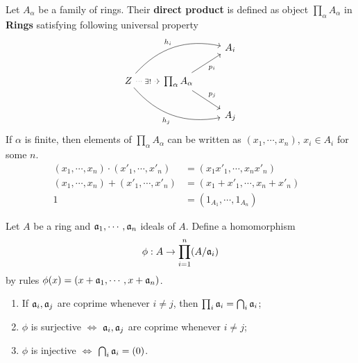 \documentclass{amsart}
\begin{document}
\begin{secdefn}
	Let $A_\alpha$ be a family of rings. Their \textbf{direct product} is defined as object $ \prod_{\alpha}A_{\alpha}$ in \textbf{Rings} satisfying following universal property
	\[
	\begin{tikzcd}
	&  & A_i \\
	Z \arrow[rru, "h_i", bend left] \arrow[r, "\exists! " description, dotted] \arrow[rrd, "h_j"', bend right] & \prod_{\alpha} A_{\alpha} \arrow[ru, "p_i"'] \arrow[rd, "p_j"] &  \\
	&  & A_j
	\end{tikzcd}
	\]
	If $\alpha$ is finite, then elements of $\prod_{\alpha}A_{\alpha}$ can be written as $(x_1, \cdots ,x_n)$, $x_i \in A_i$ for some $n$.
	\[
	\begin{aligned}
	(x_1, \cdots, x_n) \cdot (x'_1, \cdots, x'_n)&= (x_1 x'_1, \cdots, x_n x'_n)&\\
	(x_1, \cdots, x_n) +(x'_1, \cdots, x'_n)&= (x_1 + x'_1, \cdots, x_n + x'_n)&\\
	1&=(1_{A_1}, \cdots, 1_{A_n})&
	\end{aligned}
	\]
\end{secdefn}

Let $A$ be a ring and $\mathfrak{a}_1, \cdots, \mathfrak{a}_n$ ideals of $A$. Define a homomorphism
\[
\phi: A \rightarrow \prod_{i=1}^{n}(A/\mathfrak{a}_i)
\]
by rules $\phi(x)= (x+\mathfrak{a}_1, \cdots, x+\mathfrak{a}_n)$.

\begin{secprop}[\ref{}]
	\begin{enumerate}
		\item If $\mathfrak{a}_i, \mathfrak{a}_j$ are coprime whenever $i \neq j$, then $\prod_{i} \mathfrak{a}_i = \bigcap_{i} \mathfrak{a}_i$;
		\item $\phi$ is surjective $\Leftrightarrow$ $\mathfrak{a}_i,\mathfrak{a}_j$ are coprime whenever $i \neq j$;
		\item $\phi$ is injective $\Leftrightarrow$ $\bigcap_{i} \mathfrak{a}_i =(0)$.
	\end{enumerate}
\end{secprop}
\end{document}
